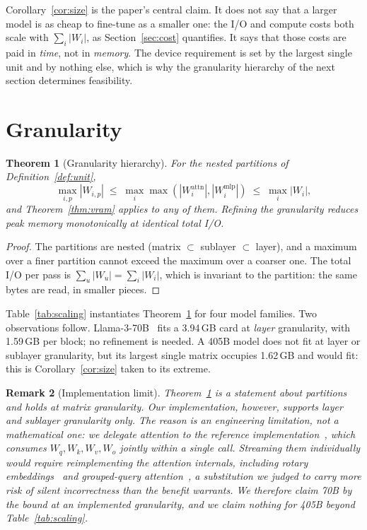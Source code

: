 \documentclass[preprint,12pt]{elsarticle}
\newtheorem{theorem}{Theorem}
\newtheorem{remark}[theorem]{Remark}
\newcommand{\Wu}{\lvert W_u \rvert}
\begin{document}
Corollary~\ref{cor:size} is the paper's central claim. It does not say that a larger model is as cheap to
fine-tune as a smaller one: the I/O and
compute costs both scale with $\sum_i |W_i|$, as Section~\ref{sec:cost} quantifies. It says that those
costs are paid in \emph{time}, not in \emph{memory}. The device requirement is set by the largest
single unit and by nothing else, which is why the granularity hierarchy of the next section
determines feasibility.

\section{Granularity}
\label{sec:gran}

\begin{theorem}[Granularity hierarchy]
\label{thm:gran}
For the nested partitions of Definition~\ref{def:unit},
\begin{equation}
\max_{i,p} |W_{i,p}| \;\le\; \max_i \max\!\left(|W_i^{\text{attn}}|, |W_i^{\text{mlp}}|\right)
\;\le\; \max_i |W_i| ,
\end{equation}
and Theorem~\ref{thm:vram} applies to any of them. Refining the granularity reduces peak memory
monotonically at identical total I/O.
\end{theorem}

\begin{proof}
The partitions are nested (matrix $\subset$ sublayer $\subset$ layer), and a maximum over a finer
partition cannot exceed the maximum over a coarser one. The total I/O per pass is
$\sum_u \Wu = \sum_i |W_i|$, which is invariant to the partition: the same bytes are read, in
smaller pieces.
\end{proof}

Table~\ref{tab:scaling} instantiates Theorem~\ref{thm:gran} for four model families. Two observations follow.
Llama-3-70B~\cite{grattafiori2024llama3} fits a 3.94\,GB card at \emph{layer} granularity, with
1.59\,GB per block; no refinement is needed. A 405B model does not fit at layer or sublayer
granularity, but its largest single matrix occupies 1.62\,GB and would fit: this is Corollary~\ref{cor:size}
taken to its extreme.

\begin{remark}[Implementation limit]
\label{rem:matrixlimit}
Theorem~\ref{thm:gran} is a statement about partitions and holds at matrix granularity. Our
\emph{implementation}, however, supports layer and sublayer granularity only. The reason is
an engineering limitation, not a mathematical one: we delegate attention to the reference
implementation~\cite{wolf2020transformers}, which consumes $W_q, W_k, W_v, W_o$ jointly within a
single call. Streaming them individually would require reimplementing the attention internals,
including rotary embeddings~\cite{su2024roformer} and grouped-query
attention~\cite{shazeer2019mqa}, a substitution we judged to carry more risk of silent
incorrectness than the benefit warrants. We therefore claim 70B by the bound at an implemented
granularity, and we claim nothing for 405B beyond Table~\ref{tab:scaling}.
\end{remark}
\end{document}
